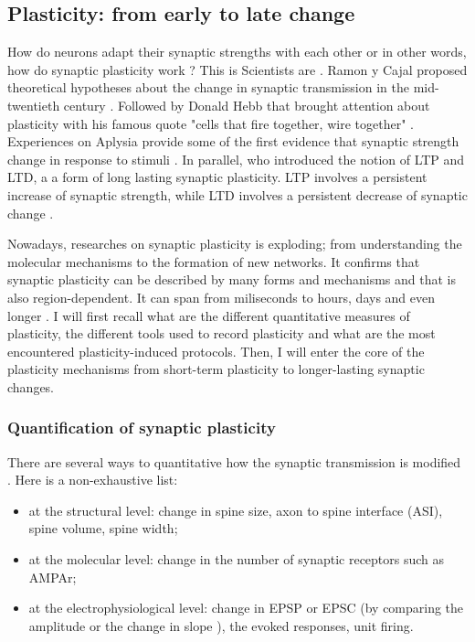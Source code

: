\subsection{Plasticity: from early to late change }
How do neurons adapt their synaptic strengths with each other or in other words, how do synaptic plasticity work ?  This is Scientists are  \citep{takeuchi_synaptic_2014}. Ramon y Cajal proposed theoretical hypotheses about the change in synaptic transmission in the mid-twentieth century \citep{cajal_estructura_1888}. Followed by Donald Hebb that brought attention about plasticity with his famous quote "cells that fire together, wire together" \citep{hebb_organization_1949}. Experiences on Aplysia provide some of the first evidence that synaptic strength change in response to stimuli \citep{kandel_behavioral_1979}. In parallel, \citep{bliss_long-lasting_1973} who introduced the notion of \acrfull{LTP} and \acrfull{LTD}, a a form of long lasting synaptic plasticity. \acrshort{LTP} involves a persistent increase of synaptic strength, while \acrshort{LTD} involves a persistent decrease of synaptic change \citep{lamprecht_structural_2004}. 

Nowadays, researches on synaptic plasticity is exploding; from understanding the molecular mechanisms to the formation of new networks. It confirms that synaptic plasticity can be described by many forms and mechanisms and that is also region-dependent. It can span from miliseconds to hours, days and even longer \citep{citri_synaptic_2008}. I will first recall what are the different quantitative measures of plasticity, the different tools used to record plasticity and what are the most encountered plasticity-induced protocols. Then, I will enter the core of the plasticity mechanisms from short-term plasticity to longer-lasting synaptic changes.  




\subsubsection{Quantification of synaptic plasticity}
There are several ways to quantitative how the synaptic transmission is modified \citep{cirelli_sleep_2017}. Here is a non-exhaustive list: 
\begin{itemize}
    \item at the structural level: change in spine size, axon to spine interface (ASI), spine volume, spine width;
    \item at the molecular level: change in the number of synaptic receptors such as AMPAr;
    \item at the electrophysiological level: change in \acrshort{EPSP} or \acrshort{EPSC} (by comparing the amplitude \citep{bi_synaptic_1998} or the change in slope \citep{frey_effects_1993}), the  evoked responses, unit firing.
\end{itemize}


